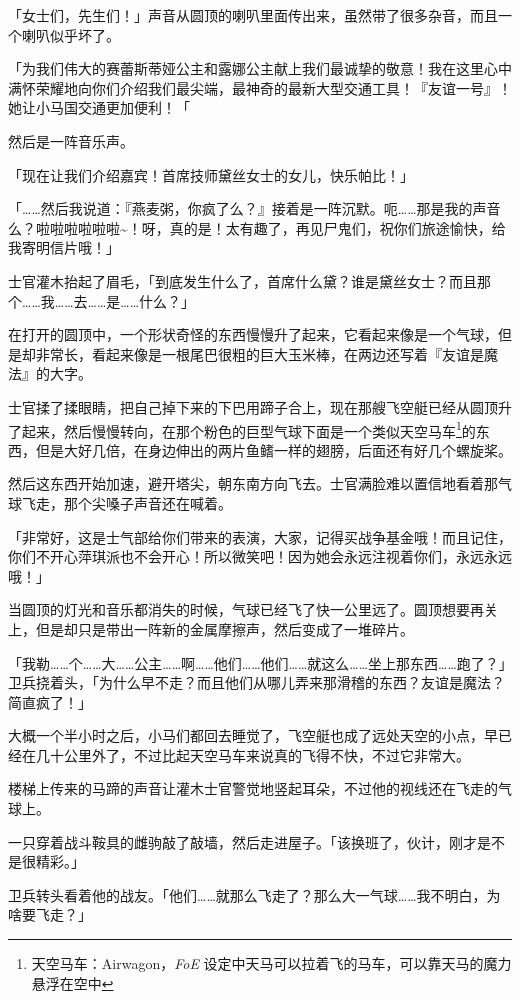 「女士们，先生们！」声音从圆顶的喇叭里面传出来，虽然带了很多杂音，而且一个喇叭似乎坏了。

「为我们伟大的赛蕾斯蒂娅公主和露娜公主献上我们最诚挚的敬意！我在这里心中满怀荣耀地向你们介绍我们最尖端，最神奇的最新大型交通工具！『友谊一号』！她让小马国交通更加便利！「

然后是一阵音乐声。

「现在让我们介绍嘉宾！首席技师黛丝女士的女儿，快乐帕比！」

「……然后我说道：『燕麦粥，你疯了么？』接着是一阵沉默。呃……那是我的声音么？啦啦啦啦啦啦\textasciitilde！呀，真的是！太有趣了，再见尸鬼们，祝你们旅途愉快，给我寄明信片哦！」

士官灌木抬起了眉毛，「到底发生什么了，首席什么黛？谁是黛丝女士？而且那个……我……去……是……什么？」

在打开的圆顶中，一个形状奇怪的东西慢慢升了起来，它看起来像是一个气球，但是却非常长，看起来像是一根尾巴很粗的巨大玉米棒，在两边还写着『友谊是魔法』的大字。

士官揉了揉眼睛，把自己掉下来的下巴用蹄子合上，现在那艘飞空艇已经从圆顶升了起来，然后慢慢转向，在那个粉色的巨型气球下面是一个类似天空马车\footnote{天空马车：Airwagon，\emph{FoE} 设定中天马可以拉着飞的马车，可以靠天马的魔力悬浮在空中}的东西，但是大好几倍，在身边伸出的两片鱼鳍一样的翅膀，后面还有好几个螺旋桨。

然后这东西开始加速，避开塔尖，朝东南方向飞去。士官满脸难以置信地看着那气球飞走，那个尖嗓子声音还在喊着。

「非常好，这是士气部给你们带来的表演，大家，记得买战争基金哦！而且记住，你们不开心萍琪派也不会开心！所以微笑吧！因为她会永远注视着你们，永远永远哦！」

当圆顶的灯光和音乐都消失的时候，气球已经飞了快一公里远了。圆顶想要再关上，但是却只是带出一阵新的金属摩擦声，然后变成了一堆碎片。

「我勒……个……大……公主……啊……他们……他们……就这么……坐上那东西……跑了？」卫兵挠着头，「为什么早不走？而且他们从哪儿弄来那滑稽的东西？友谊是魔法？简直疯了！」

\horizonline

大概一个半小时之后，小马们都回去睡觉了，飞空艇也成了远处天空的小点，早已经在几十公里外了，不过比起天空马车来说真的飞得不快，不过它非常大。

楼梯上传来的马蹄的声音让灌木士官警觉地竖起耳朵，不过他的视线还在飞走的气球上。

一只穿着战斗鞍具的雌驹敲了敲墙，然后走进屋子。「该换班了，伙计，刚才是不是很精彩。」

卫兵转头看着他的战友。「他们……就那么飞走了？那么大一气球……我不明白，为啥要飞走？」

